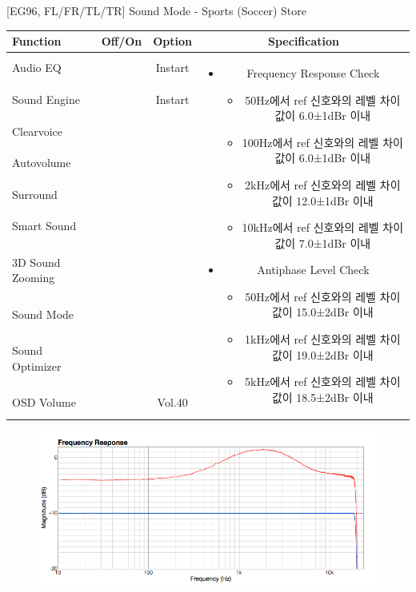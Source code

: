 \begin{frame}[t]{[EG96, FL/FR/TL/TR] Sound Mode - Sports (Soccer) Store}
\begin{tiny}
\begin{tabular}{@{}lccc@{}}
\toprule
Function & Off/On & Option & Specification \\
\midrule
Audio EQ & \color{black}{Off} & Instart &
\multirow{10}{60mm}{
\begin{itemize}
\item Frequency Response Check
	\begin{itemize}
	\item 50Hz에서 ref 신호와의 레벨 차이값이 6.0±1dBr 이내
	\item 100Hz에서 ref 신호와의 레벨 차이값이 6.0±1dBr 이내
	\item 2kHz에서 ref 신호와의 레벨 차이값이 12.0±1dBr 이내
	\item 10kHz에서 ref 신호와의 레벨 차이값이 7.0±1dBr 이내
	\end{itemize}
\item Antiphase Level Check
	\begin{itemize}
	\item 50Hz에서 ref 신호와의 레벨 차이값이 15.0±2dBr 이내
	\item 1kHz에서 ref 신호와의 레벨 차이값이 19.0±2dBr 이내
	\item 5kHz에서 ref 신호와의 레벨 차이값이 18.5±2dBr 이내
	\end{itemize}
\end{itemize}
} \\
Sound Engine & \color{blue}{On} & Instart & \\
Clearvoice & \color{black}{Off} & & \\
Autovolume & \color{black}{Off} & & \\
Surround & \color{black}{Off} & & \\
Smart Sound & \color{black}{Off} & & \\
3D Sound Zooming & \color{black}{Off} & & \\
Sound Mode & \color{blue}{On} & \color{blue}{Sports} & \\
Sound Optimizer & \color{black}{Off} & & \\
OSD Volume & \color{blue}{On} & Vol.40 & \\
\midrule
\end{tabular}
\end{tiny}

\begin{figure}[b]
\includegraphics[height=0.4\textwidth]{figures/sports_store.png}
\end{figure}

\end{frame}


